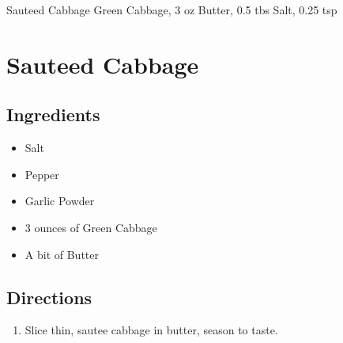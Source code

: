 Sauteed Cabbage
  Green Cabbage, 3 oz
  Butter, 0.5 tbs
  Salt, 0.25 tsp

\section{ Sauteed Cabbage }

\subsection{ Ingredients }

\begin{itemize}
  \item Salt
  \item Pepper
  \item Garlic Powder
  \item 3 ounces of Green Cabbage
  \item A bit of Butter
\end{itemize}

\subsection{ Directions }

\begin{enumerate}
  \item Slice thin, sautee cabbage in butter, season to taste. 
\end{enumerate}


